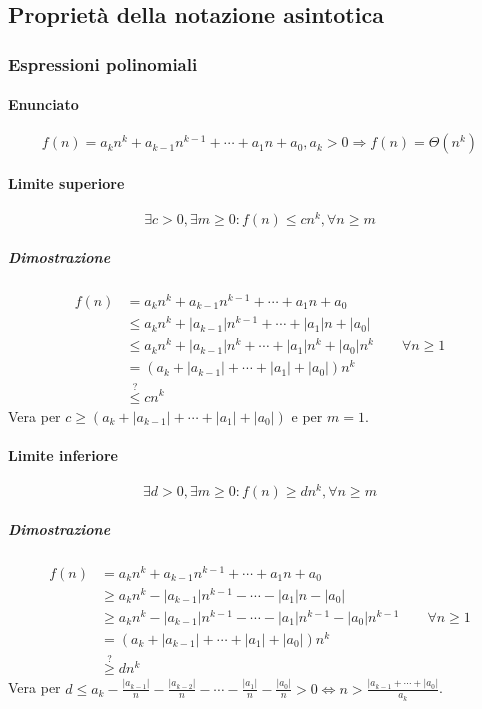 \subsection{Propriet\`a della notazione asintotica}
\subsubsection{Espressioni polinomiali}
\paragraph{Enunciato}
\begin{equation*}
f(n)=a_kn^k+a_{k-1}n^{k-1}+\cdots+a_1n+a_0, a_k>0\Rightarrow f(n)=\Theta(n^k)
\end{equation*}
\paragraph{Limite superiore}
\begin{equation*}
\exists c>0, \exists m\ge 0:f(n)\le cn^k,\forall n\ge m
\end{equation*}
\subparagraph{Dimostrazione}
\begin{align*}
f(n)&=a_kn^k+a_{k-1}n^{k-1}+\cdots+a_1n+a_0\\
&\le a_kn^k+|a_{k-1}|n^{k-1}+\cdots+|a_1|n+|a_0|\\
&\le a_kn^k+|a_{k-1}|n^k+\cdots+|a_1|n^k+|a_0|n^k\quad\quad\forall n\ge 1\\
&= (a_k+|a_{k-1}|+\cdots+|a_1|+|a_0|)n^k\\
&\overset{?}{\le} cn^k
\end{align*}
Vera per $c\ge (a_k+|a_{k-1}|+\cdots+|a_1|+|a_0|)$ e per $m=1$.
\paragraph{Limite inferiore}
\begin{equation*}
\exists d>0, \exists m\ge 0:f(n)\ge dn^k,\forall n\ge m
\end{equation*}
\subparagraph{Dimostrazione}
\begin{align*}
f(n)&=a_kn^k+a_{k-1}n^{k-1}+\cdots+a_1n+a_0\\
&\ge a_kn^k-|a_{k-1}|n^{k-1}-\cdots-|a_1|n-|a_0|\\
&\ge a_kn^k-|a_{k-1}|n^{k-1}-\cdots-|a_1|n^{k-1}-|a_0|n^{k-1}\quad\quad\forall n\ge 1\\
&= (a_k+|a_{k-1}|+\cdots+|a_1|+|a_0|)n^k\\
&\overset{?}{\ge} dn^k
\end{align*}
Vera per $d\le a_k-\frac{|a_{k-1}|}{n}-\frac{|a_{k-2}|}{n}-\cdots-\frac{|a_{1}|}{n}-\frac{|a_{0}|}{n}>0\Leftrightarrow n>\frac{|a_{k-1}+\cdots+|a_0|}{a_k}$.
